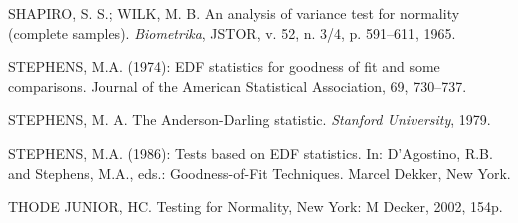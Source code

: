 \documentclass[a4paper,11pt]{article} %
\begin{document}
\begin{flushleft}
\noindent SHAPIRO, S. S.; WILK, M. B. An analysis of variance test for normality (complete samples). {\it Biometrika}, JSTOR, v. 52, n. 3/4, p. 591–611, 1965.\newline

\noindent STEPHENS, M.A. (1974): EDF statistics for goodness of fit and some comparisons. Journal of the American Statistical Association, 69, 730–737.\newline
    
\noindent STEPHENS, M. A. The Anderson-Darling statistic. {\it Stanford University}, 1979.\newline

\noindent STEPHENS, M.A. (1986): Tests based on EDF statistics. In: D’Agostino, R.B. and Stephens, M.A., eds.: Goodness-of-Fit Techniques. Marcel Dekker, New York.\newline

\noindent THODE JUNIOR, HC. Testing for Normality, New York: M Decker, 2002, 154p.


\end{flushleft}

	
	
	
\end{document}
